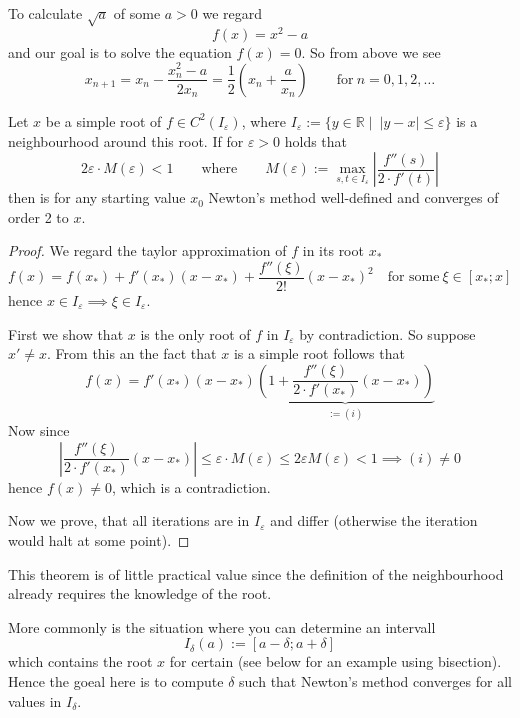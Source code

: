\begin{example}
   To calculate \(\sqrt{a}\) of some \(a > 0\) we regard
   \[f(x) = x^2 - a\]
   and our goal is to solve the equation \(f(x) = 0\).
   So from above we see
   \[x_{n+1} = x_n - \frac{x_n^2 - a}{2x_n} = \frac{1}{2}\left(x_n + \frac{a}{x_n}\right) \qquad\text{for}~n = 0, 1, 2, \ldots\]
\end{example}

\begin{theorem}\label{thm:newt_meth_conv}
   Let \(x\) be a simple root of \(f \in C^2(I_\varepsilon)\), where \(I_\varepsilon := \{y \in \mathbb{R} \mid~|y - x| \leq \varepsilon\}\) is a neighbourhood around this root.
   If for \(\varepsilon > 0\) holds that
   \[2 \varepsilon \cdot M(\varepsilon) < 1 \qquad\text{where}\qquad M(\varepsilon) := \max_{s, t \in I_\varepsilon} \left|\frac{f''(s)}{2 \cdot f'(t)}\right|\]
   then is for any starting value \(x_0\) Newton's method well-defined and converges of order 2 to \(x\).
\end{theorem}
\begin{proof}
   We regard the taylor approximation of \(f\) in its root \(x_\ast\)
   \[f(x) = f(x_\ast) + f'(x_\ast)(x - x_\ast) + \frac{f''(\xi)}{2!}(x - x_\ast)^2 \quad\text{for some}~\xi \in [x_\ast; x]\]
   hence \(x \in I_\varepsilon \implies \xi \in I_\varepsilon\).

   First we show that \(x\) is the only root of \(f\) in \(I_\varepsilon\) by contradiction.
   So suppose \(x' \neq x\).
   From this an the fact that \(x\) is a simple root follows that
   \[f(x) = f'(x_\ast)(x - x_\ast)\underbrace{\left(1 + \frac{f''(\xi)}{2 \cdot f'(x_\ast)}(x - x_\ast)\right)}_{:= (i)}\]
   Now since
   \[\left|\frac{f''(\xi)}{2 \cdot f'(x_\ast)}(x - x_\ast)\right| \leq \varepsilon \cdot M(\varepsilon) \leq 2 \varepsilon M(\varepsilon) < 1 \implies (i) \neq 0\]
   hence \(f(x) \neq 0\), which is a contradiction.

   Now we prove, that all iterations are in \(I_\varepsilon\) and differ (otherwise the iteration would halt at some point).
\end{proof}
\begin{remark}
   This theorem is of little practical value since the definition of the neighbourhood already requires the knowledge of the root.

   More commonly is the situation where you can determine an intervall
   \[I_\delta(a) := [a - \delta; a + \delta]\]
   which contains the root \(x\) for certain (see below for an example using bisection).
   Hence the goeal here is to compute \(\delta\) such that Newton's method converges for all values in \(I_\delta\).
\end{remark}

